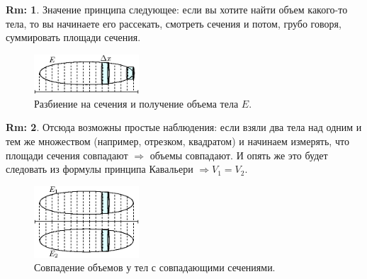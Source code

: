 \documentclass[12pt]{article}
\theoremstyle{definition}
\newtheorem{rem}{Rm:}
\begin{document}
\begin{rem}
	Значение принципа следующее: если вы хотите найти объем какого-то тела, то вы начинаете его рассекать, смотреть сечения и потом, грубо говоря, суммировать площади сечения.
	\begin{figure}[H]
		\centering
		\includegraphics[width=0.35\textwidth]{MA4L5_2.eps}
		\caption{Разбиение на сечения и получение объема тела $E$.}
		\label{5_2}
	\end{figure}
\end{rem}
\begin{rem}
	Отсюда возможны простые наблюдения: если взяли два тела над одним и тем же множеством (например, отрезком, квадратом) и начинаем измерять, что площади сечения совпадают $\Rightarrow$ объемы совпадают. И опять же это будет следовать из формулы принципа Кавальери $\Rightarrow V_1 = V_2$.
	\begin{figure}[H]
		\centering
		\includegraphics[width=0.35\textwidth]{MA4L5_3.eps}
		\caption{Совпадение объемов у тел с совпадающими сечениями.}
		\label{5_3}
	\end{figure}
\end{rem}
\end{document}
